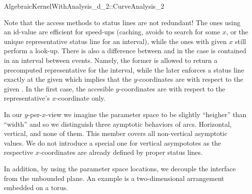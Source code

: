 \begin{ccRefConcept}{AlgebraicKernelWithAnalysis_d_2::CurveAnalysis_2}

Note that the access methods to status lines are not redundant! The ones
using an id-value are efficient for speed-ups (caching, avoids to search for
some $x$, or the unique representative status line for an interval),
while the ones with given $x$ still perform a look-up. There is also a 
difference between  and 
 in the case  is contained 
in an interval between events. Namely, the former is allowed to return a
precomputed representative for the interval, while the later enforces
a status line exactly at the given  which implies that the 
$y$-coordinates are with respect to the given . In the first case,
the accesible $y$-coordinates are with respect to the representative's 
$x$-coordinate only.

%
%


In our $y$-per-$x$-view we imagine the parameter space to be slightly 
``heigher'' than ``width'' and so we distinguish three aymptotic behaviors
of arcs. Horizontal, vertical, and none of them. This member covers 
all non-vertical asymptotic values. We do not introduce a special one
for vertical asympototes as the respective $x$-coordinates are already defined
by proper status lines.

In addition, by using the parameter space locations, 
we decouple the interface from the unbounded plane. An example is a 
two-dimensional arrangement embedded on a torus.

\end{ccRefConcept}
